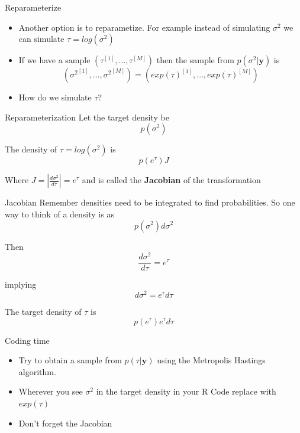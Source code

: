 \documentclass[10pt]{beamer}
\begin{document}
\begin{frame}{Reparameterize}
  \begin{itemize}
  \item Another option is to reparametize.  For example instead of simulating $\sigma^2$ we can simulate $\tau=log\left(\sigma^2\right)$

  \item If we have a sample $(\tau^{[1]},\ldots,\tau^{[M]})$ then the sample from $p(\sigma^2|{\bm y})$ is
    \begin{equation}
      \left({\sigma^2}^{[1]},\ldots,{\sigma^2}^{[M]}\right)=
      \left(exp(\tau)^{[1]},\ldots,exp(\tau)^{[M]}\right)
    \end{equation}

  \item How do we simulate $\tau$?
  \end{itemize}
\end{frame}
\begin{frame}{Reparameterization}
  Let the target density be
  \begin{equation}
    p(\sigma^2)
  \end{equation}

  The density of $\tau=log(\sigma^2)$ is
  \begin{equation}
    p(e^{\tau})J
  \end{equation}

  Where $J=\left|\frac{d\sigma^2}{d\tau}\right|=e^{\tau}$ and is called the {\bf Jacobian} of the transformation
\end{frame}
\begin{frame}{Jacobian}
  Remember densities need to be integrated to find probabilities.  So one way to think of a density is as
  \begin{equation}
    p(\sigma^2)d\sigma^2
  \end{equation}

  Then
  \begin{equation}
    \frac{d\sigma^2}{d\tau}=e^{\tau}
  \end{equation}

  implying
  \begin{equation}
    d\sigma^2=e^{\tau}d\tau
  \end{equation}

  The target density of $\tau$ is
  \begin{equation}
    p(e^{\tau})e^{\tau}d\tau
  \end{equation}
\end{frame}
\begin{frame}{Coding time}
  \begin{itemize}
  \item Try to obtain a sample from $p(\tau|{\bm y})$ using the Metropolis Hastings algorithm.

  \item Wherever you see $\sigma^2$ in the target density in your R Code replace with $exp(\tau)$

  \item Don't forget the Jacobian
  \end{itemize}
\end{frame}
\end{document}
